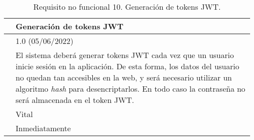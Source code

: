\begin{table}[H]
\begin{center}
\begin{tabular}{|p{3cm}|p{10cm}|} \hline
\centering {\bf NFR-10} & Generación de tokens JWT  \\ \hline\hline
\centering {\bf Versión} & 1.0 (05/06/2022) \\ \hline
\centering {\bf Descripción} & El sistema deberá generar tokens JWT \cite{jwt} cada vez que un usuario inicie sesión en la aplicación. De esta forma, los datos del usuario no quedan tan accesibles en la web, y será necesario utilizar un algoritmo  {\it hash} para desencriptarlos. En todo caso la contraseña no será almacenada en el token JWT. \\ \hline
\centering {\bf Importancia} & Vital \\ \hline
\centering {\bf Urgencia} & Inmediatamente \\ \hline
\end{tabular}
\caption{Requisito no funcional 10. Generación de tokens JWT.}
\label{enlaceNFR10}
\end{center}
\end{table}